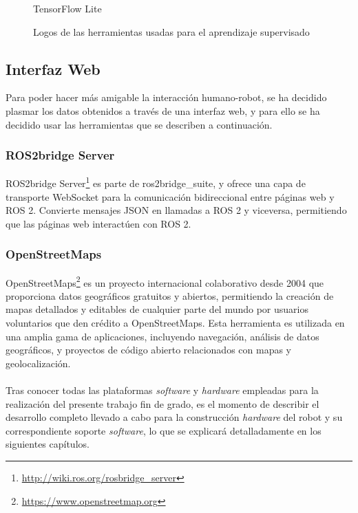 \begin{figure}[ht!]
\begin{minipage}{0.25\linewidth}
		\caption*{\centering TensorFlow Lite} %
	\end{minipage}
	\caption{Logos de las herramientas usadas para el aprendizaje supervisado}
	\label{fig:herramientasas}
\end{figure}

\subsection{Interfaz Web}
\label{subsec:interfazweb}

Para poder hacer más amigable la interacción humano-robot, se ha decidido plasmar los datos obtenidos a través de una interfaz web, y para ello se ha decidido usar las herramientas que se describen a continuación.
 
\subsubsection{ROS2bridge Server}
\label{subsubsec:ros2bridge}

ROS2bridge Server\footnote{\url{http://wiki.ros.org/rosbridge_server}} es parte de ros2bridge\_suite, y ofrece una capa de transporte WebSocket para la comunicación bidireccional entre páginas web y ROS 2. Convierte mensajes JSON en llamadas a ROS 2 y viceversa, permitiendo que las páginas web interactúen con ROS 2. 

\subsubsection{OpenStreetMaps}
\label{subsubsec:openstreetmaps}

OpenStreetMaps\footnote{\url{https://www.openstreetmap.org}} es un proyecto internacional colaborativo desde 2004 que proporciona datos geográficos gratuitos y abiertos, permitiendo la creación de mapas detallados y editables de cualquier parte del mundo por usuarios voluntarios que den crédito a OpenStreetMaps. Esta herramienta es utilizada en una amplia gama de aplicaciones, incluyendo navegación, análisis de datos geográficos, y proyectos de código abierto relacionados con mapas y geolocalización.\\\\



Tras conocer todas las plataformas \textit{software} y \textit{hardware} empleadas para la realización del presente trabajo fin de grado, es el momento de describir el desarrollo completo llevado a cabo para la construcción \textit{hardware} del robot y su correspondiente soporte \textit{software}, lo que se explicará detalladamente en los siguientes capítulos.
